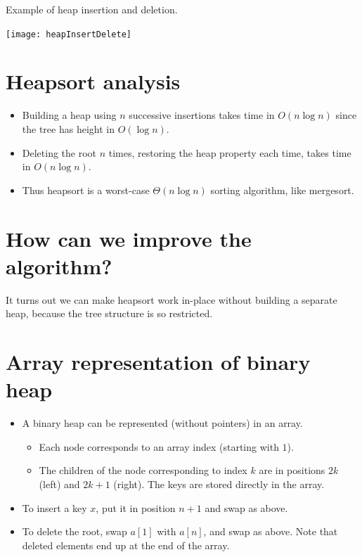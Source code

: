 \begin{Boxample}
Example of heap insertion and deletion. 
\begin{center}
\texttt{[image: heapInsertDelete]}
\end{center}
\end{Boxample}

\section{Heapsort analysis}
\begin{itemize}
\item Building a heap using $n$ successive insertions takes time in 
$O(n\log n)$ since the tree has height in $O(\log n)$.
\item Deleting the root $n$ times, restoring the heap property each time, takes
 time in $O(n \log n)$.
\item Thus heapsort is a worst-case $\Theta(n \log n)$ sorting algorithm, like 
mergesort. 
\end{itemize}

\section{How can we improve the algorithm?}
It turns out we can make heapsort work in-place without building a separate heap, 
because the tree structure is so restricted.

\section{Array representation of binary heap}
\begin{itemize}
  \item A binary heap can be represented  (without pointers) in an array. 
  \begin{itemize}
	\item Each node corresponds to an array index (starting with $1$). 
	\item The children of the node corresponding to index $k$ are in positions $2k$ (left) 
	and $2k+1$ (right). The keys are stored directly in the array.
  \end{itemize}
  \item To insert a key $x$, put it in position $n+1$ and swap as above.
  \item To delete the root, swap $a[1]$ with $a[n]$, and swap as above. 
  Note that deleted elements end up at the end of the array.
\end{itemize}

